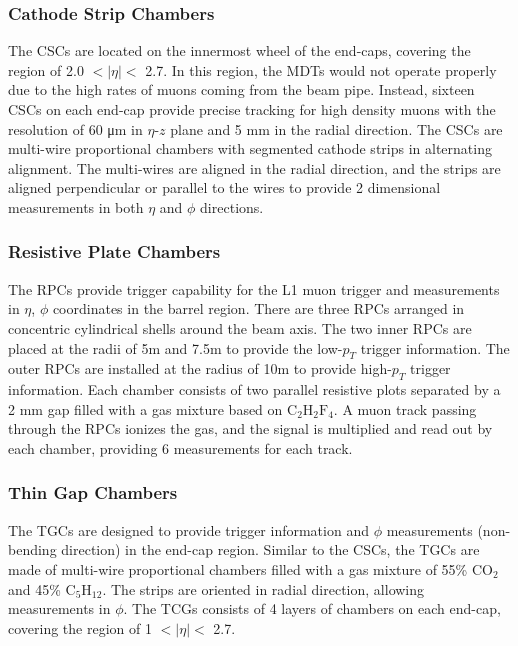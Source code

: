 \subsubsection{Cathode Strip Chambers}
\label{sec:atlas:csc}

The CSCs are located on the innermost wheel of the end-caps, covering the region of 2.0 $<|\eta|<$ 2.7. In this region, the MDTs would not operate properly due to the high rates of muons coming from the beam pipe. Instead, sixteen CSCs on each end-cap provide precise tracking for high density muons with the resolution of 60 \si{\micro\meter} in $\eta$-$z$ plane and 5 \si{\milli\meter} in the radial direction. The CSCs are multi-wire proportional chambers with segmented cathode strips in alternating alignment. The multi-wires are aligned in the radial direction, and the strips are aligned perpendicular or parallel to the wires to provide 2 dimensional measurements in both $\eta$ and $\phi$ directions.


\subsubsection{Resistive Plate Chambers}
\label{sec:atlas:rpc}

The RPCs provide trigger capability for the L1 muon trigger and measurements in $\eta$, $\phi$ coordinates in the barrel region. There are three RPCs arranged in concentric cylindrical shells around the beam axis. The two inner RPCs are placed at the radii of 5\si{\meter} and 7.5\si{\meter} to provide the low-$p_{T}$ trigger information. The outer RPCs are installed at the radius of 10\si{\meter} to provide high-$p_{T}$ trigger information. Each chamber consists of two parallel resistive plots separated by a 2 \si{\milli\meter} gap filled with a gas mixture based on $\mathrm{C}_{2}\mathrm{H}_{2}\mathrm{F}_{4}$. A muon track passing through the RPCs ionizes the gas, and the signal is multiplied and read out by each chamber, providing 6 measurements for each track.

\subsubsection{Thin Gap Chambers}
\label{sec:atlas:tgc}

The TGCs are designed to provide trigger information and $\phi$ measurements (non-bending direction) in the end-cap region. Similar to the CSCs, the TGCs are made of multi-wire proportional chambers filled with a gas mixture of 55\% $\mathrm{CO}_{2}$ and 45\% $\mathrm{C}_{5}\mathrm{H}_{12}$. The strips are oriented in radial direction, allowing measurements in $\phi$. The TCGs consists of 4 layers of chambers on each end-cap, covering the region of 1 $<|\eta|<$ 2.7.


